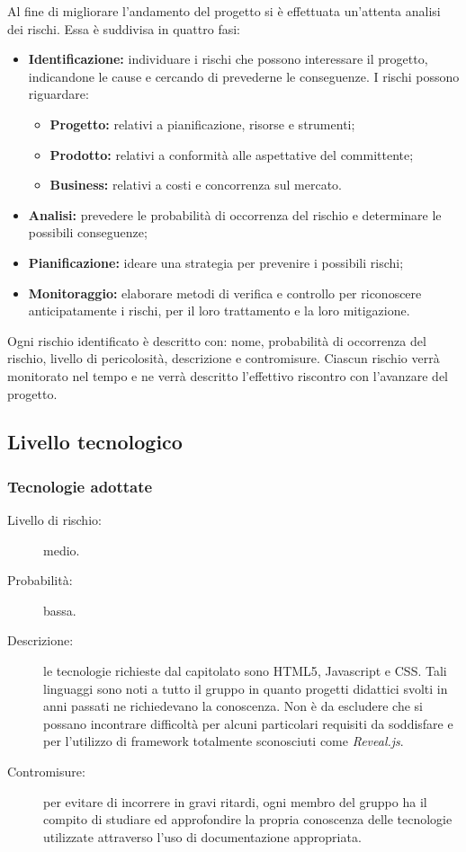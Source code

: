 Al fine di migliorare l'andamento del progetto si è effettuata un'attenta analisi dei rischi. Essa è suddivisa in quattro fasi:
\begin{itemize}
	\item \textbf{Identificazione:} individuare i rischi che possono interessare il progetto, indicandone le cause e cercando di prevederne
	le conseguenze. I rischi possono riguardare:
	\begin{itemize}
		\item \textbf{Progetto:} relativi a pianificazione, risorse e strumenti;
		\item \textbf{Prodotto:} relativi a conformità alle aspettative del committente;
		\item \textbf{\gls{Business}:} relativi a costi e concorrenza sul mercato.
	\end{itemize}
	\item \textbf{Analisi:} prevedere le probabilità di occorrenza del rischio e determinare le possibili conseguenze;
	\item \textbf{Pianificazione:} ideare una strategia per prevenire i possibili rischi;
	\item \textbf{Monitoraggio:} elaborare metodi di verifica e controllo per riconoscere anticipatamente i rischi, per il loro trattamento e la loro mitigazione.
\end{itemize}
Ogni rischio identificato è descritto con: nome, probabilità di occorrenza del rischio, livello di pericolosità, descrizione e contromisure. Ciascun rischio verrà monitorato nel tempo e ne verrà descritto l'effettivo riscontro con l'avanzare del progetto.

\subsection{Livello tecnologico}
\subsubsection{Tecnologie adottate}
\begin{description}
	\item[Livello di rischio:] medio.
	\item[Probabilità:] bassa.
	\item[Descrizione:] le tecnologie richieste dal capitolato sono \gls{HTML5}, \gls{Javascript} e \gls{CSS}. Tali linguaggi sono noti a tutto il gruppo in quanto progetti didattici svolti in anni passati ne richiedevano la conoscenza. Non è da escludere che si possano incontrare difficoltà per alcuni particolari requisiti da soddisfare e per l'utilizzo di \gls{framework} totalmente sconosciuti come \textit{\gls{Reveal.js}}.
	\item[Contromisure:] per evitare di incorrere in gravi ritardi, ogni membro del gruppo ha il compito di studiare ed approfondire la propria conoscenza delle tecnologie utilizzate attraverso l'uso di documentazione appropriata.
\end{description}
